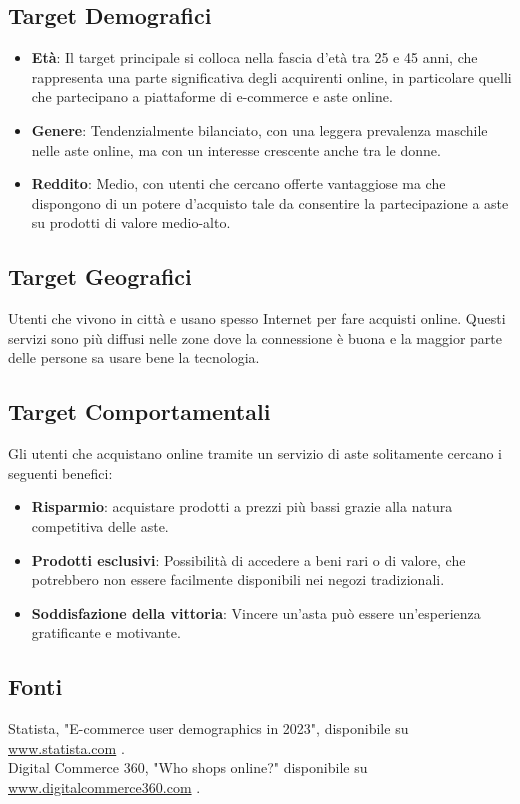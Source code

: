 \subsection{Target Demografici}
\begin{itemize}
	\item \textbf{Età}:
	      Il target principale si colloca nella fascia d'età tra 25 e 45 anni, che rappresenta una parte significativa degli acquirenti online, in particolare quelli che partecipano a piattaforme di e-commerce e aste online.
	\item \textbf{Genere}:
	      Tendenzialmente bilanciato, con una leggera prevalenza maschile nelle aste online, ma con un interesse crescente anche tra le donne.
	\item \textbf{Reddito}:
	      Medio, con utenti che cercano offerte vantaggiose ma che dispongono di un potere d'acquisto tale da consentire la partecipazione a aste su prodotti di valore medio-alto.
\end{itemize}

\subsection{Target Geografici}
Utenti che vivono in città e usano spesso Internet per fare acquisti online.
Questi servizi sono più diffusi nelle zone dove la connessione è buona e la maggior parte delle persone sa usare bene la tecnologia.

\subsection{Target Comportamentali}
Gli utenti che acquistano online tramite un servizio di aste solitamente cercano i seguenti benefici:
\begin{itemize}
	\item \textbf{Risparmio}: acquistare prodotti a prezzi più bassi grazie alla natura competitiva delle aste.
	\item \textbf{Prodotti esclusivi}: Possibilità di accedere a beni rari o di valore, che potrebbero non essere facilmente disponibili nei negozi tradizionali.
	\item \textbf{Soddisfazione della vittoria}: Vincere un'asta può essere un'esperienza gratificante e motivante.
\end{itemize}

\subsection{Fonti}
Statista, "E-commerce user demographics in 2023", disponibile su \url{www.statista.com} .\\
Digital Commerce 360, "Who shops online?" disponibile su \url{www.digitalcommerce360.com} .

